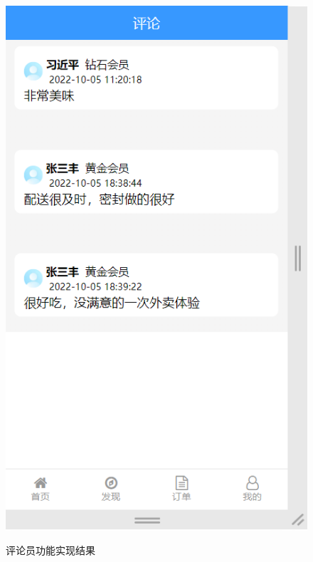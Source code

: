 \begin{figure}[H]
{\begin{minipage}[t]{0.48\linewidth}
            \includegraphics[scale=0.5]{figures/5.1.5.png}\\
        \end{minipage}
    }
    \centering
    \caption{评论员功能实现结果}
\end{figure}



